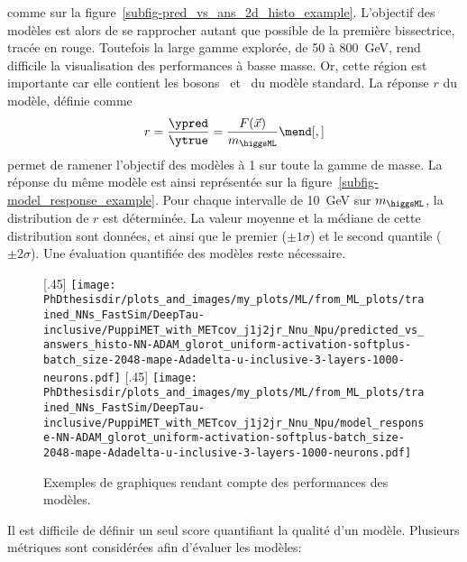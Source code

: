 comme sur la figure~\ref{subfig-pred_vs_ans_2d_histo_example}.
L'objectif des modèles est alors de se rapprocher autant que possible de la première bissectrice, tracée en rouge.
Toutefois
la large gamme explorée, de \num{50} à \SI{800}{\GeV}, rend difficile
la visualisation des performances à basse masse.
Or, cette région est importante car elle contient les bosons \Zboson\ et \higgs\ du modèle standard.
La réponse $r$ du modèle, définie comme
\begin{equation}
r = \frac{\ypred}{\ytrue} = \frac{F(\vec{x})}{m_{\higgsML}}
\mend[,]
\end{equation}
permet de ramener l'objectif des modèles à 1 sur toute la gamme de masse.
La réponse du même modèle est ainsi représentée sur la figure~\ref{subfig-model_response_example}.
Pour chaque intervalle de \SI{10}{\GeV} sur $m_{\higgsML}$,
la distribution de $r$ est déterminée.
La valeur moyenne et la médiane de cette distribution sont données,
et ainsi que le premier ($\pm1\sigma$) et le second quantile ($\pm2\sigma$).
Une évaluation quantifiée des modèles reste nécessaire.
\begin{figure}[h]
\centering

[.45\textwidth]
{\texttt{[image: \\PhDthesisdir/plots\_and\_images/my\_plots/ML/from\_ML\_plots/trained\_NNs\_FastSim/DeepTau-inclusive/PuppiMET\_with\_METcov\_j1j2jr\_Nnu\_Npu/predicted\_vs\_answers\_histo-NN-ADAM\_glorot\_uniform-activation-softplus-batch\_size-2048-mape-Adadelta-u-inclusive-3-layers-1000-neurons.pdf]}}
\hfill
{}[.45\textwidth]
{\texttt{[image: \\PhDthesisdir/plots\_and\_images/my\_plots/ML/from\_ML\_plots/trained\_NNs\_FastSim/DeepTau-inclusive/PuppiMET\_with\_METcov\_j1j2jr\_Nnu\_Npu/model\_response-NN-ADAM\_glorot\_uniform-activation-softplus-batch\_size-2048-mape-Adadelta-u-inclusive-3-layers-1000-neurons.pdf]}}

\caption{Exemples de graphiques rendant compte des performances des modèles.}
\label{fig-model_perfs_graphiques_examples}
\end{figure}
\par
Il est difficile de définir un seul score quantifiant la qualité d'un modèle.
Plusieurs métriques sont considérées afin d'évaluer les modèles:
